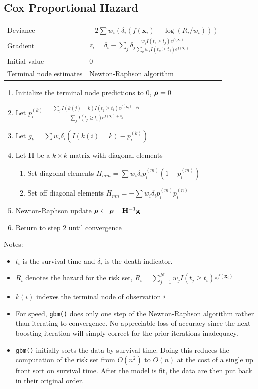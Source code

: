 \documentclass{article}
\newcommand{\mathgbf}[1]{{\mbox{\boldmath$#1$\unboldmath}}}
\begin{document}
\subsection{Cox Proportional Hazard}

\begin{tabular}{ll}
Deviance & $-2\sum w_i(\delta_i(f(\mathbf{x}_i)-\log(R_i/w_i)))$\\
Gradient & $\displaystyle z_i=\delta_i - \sum_j \delta_j
            \frac{w_jI(t_i\geq t_j)e^{f(\mathbf{x}_i)}}
                 {\sum_k w_kI(t_k\geq t_j)e^{f(\mathbf{x}_k)}}$ \\
Initial value & 0 \\
Terminal node estimates & Newton-Raphson algorithm
\end{tabular}

\begin{enumerate}
  \item Initialize the terminal node predictions to 0, $\mathgbf{\rho}=0$
  \item Let $\displaystyle
             p_i^{(k)}=\frac{\sum_j I(k(j)=k)I(t_j\geq t_i)e^{f(\mathbf{x}_i)+\rho_k}}
                            {\sum_j I(t_j\geq t_i)e^{f(\mathbf{x}_i)+\rho_k}}$
  \item Let $g_k=\sum w_i\delta_i\left(I(k(i)=k)-p_i^{(k)}\right)$
  \item Let $\mathbf{H}$ be a $k\times k$ matrix with diagonal elements
  \begin{enumerate}
     \item Set diagonal elements $H_{mm}=\sum w_i\delta_i p_i^{(m)}\left(1-p_i^{(m)}\right)$
     \item Set off diagonal elements $H_{mn}=-\sum w_i\delta_i p_i^{(m)}p_i^{(n)}$
  \end{enumerate}
  \item Newton-Raphson update $\mathgbf{\rho} \leftarrow \mathgbf{\rho} - \mathbf{H}^{-1}\mathbf{g}$
  \item Return to step 2 until convergence
\end{enumerate}

Notes:
\begin{itemize}
\item $t_i$ is the survival time and $\delta_i$ is the death indicator.
\item $R_i$ denotes the hazard for the risk set, $R_i=\sum_{j=1}^N w_jI(t_j\geq t_i)e^{f(\mathbf{x}_i)}$
\item $k(i)$ indexes the terminal node of observation $i$
\item For speed, \texttt{gbm()} does only one step of the Newton-Raphson algorithm rather than iterating to convergence. No appreciable loss of accuracy since the next boosting iteration will simply correct for the prior iterations inadequacy.
\item \texttt{gbm()} initially sorts the data by survival time. Doing this reduces the computation of the risk set from $O(n^2)$ to $O(n)$ at the cost of a single up front sort on survival time. After the model is fit, the data are then put back in their original order.
\end{itemize}
\end{document}
